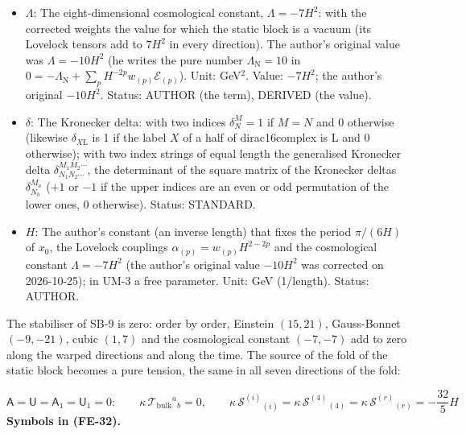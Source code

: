 \documentclass[
  10pt,
]{article}
\begin{document}
\begin{itemize}
  variation of \(\sqrt{\lvert g\rvert}\,\mathcal{L}_{(p)}\) with respect
  to \(g^{MN}\); \(\mathcal{E}_{(1)}\) the Einstein tensor,
  \(\mathcal{E}_{(2)}\) the Gauss-Bonnet tensor, \(\mathcal{E}_{(3)}\)
  the cubic Lovelock tensor); with frame indices its frame components.
  Unit: 1/length\(^{2p}\). Status: STANDARD.
\item
  \(\Lambda\): The eight-dimensional cosmological constant,
  \(\Lambda = -7H^2\): with the corrected weights the value for which
  the static block is a vacuum (its Lovelock tensors add to \(7H^2\) in
  every direction). The author's original value was \(\Lambda = -10H^2\)
  (he writes the pure number \(\Lambda_{\mathrm{N}} = 10\) in
  \(0 = -\Lambda_{\mathrm{N}} + \sum_p H^{-2p}w_{(p)}\mathcal{E}_{(p)}\)).
  Unit: GeV\(^2\). Value: \(-7H^2\); the author's original \(-10H^2\).
  Status: AUTHOR (the term), DERIVED (the value).
\item
  \(\delta\): The Kronecker delta: with two indices \(\delta^M_N = 1\)
  if \(M = N\) and 0 otherwise (likewise \(\delta_{X\mathrm{L}}\) is 1
  if the label \(X\) of a half of dirac16complex is L and 0 otherwise);
  with two index strings of equal length the generalised Kronecker delta
  \(\delta^{M_1M_2\cdots}_{N_1N_2\cdots}\), the determinant of the
  square matrix of the Kronecker deltas \(\delta^{M_a}_{N_b}\) (\(+1\)
  or \(-1\) if the upper indices are an even or odd permutation of the
  lower ones, 0 otherwise). Status: STANDARD.
\item
  \(H\): The author's constant (an inverse length) that fixes the period
  \(\pi/(6H)\) of \(x_0\), the Lovelock couplings
  \(\alpha_{(p)} = w_{(p)}H^{2-2p}\) and the cosmological constant
  \(\Lambda = -7H^2\) (the author's original value \(-10H^2\) was
  corrected on 2026-10-25); in UM-3 a free parameter. Unit: GeV
  (1/length). Status: AUTHOR.
\end{itemize}

The stabiliser of SB-9 is zero: order by order, Einstein \((15, 21)\),
Gauss-Bonnet \((-9, -21)\), cubic \((1, 7)\) and the cosmological
constant \((-7, -7)\) add to zero along the warped directions and along
the time. The source of the fold of the static block becomes a pure
tension, the same in all seven directions of the fold:

\[
\mathsf{A} = \mathsf{U} = \mathsf{A}_1 = \mathsf{U}_1 = 0:\qquad \kappa\,\mathcal{T}_{\mathrm{bulk}}{}^a{}_b = 0,\qquad
\kappa\,\mathcal{S}^{(i)}{}_{(i)} = \kappa\,\mathcal{S}^{(4)}{}_{(4)} = \kappa\,\mathcal{S}^{(r)}{}_{(r)} = -\frac{32}{5}H \tag{FE-32}
\] \textbf{Symbols in (FE-32).}
\end{document}
